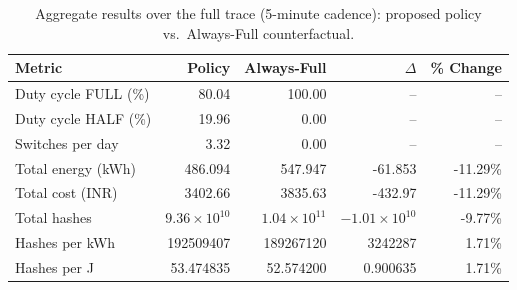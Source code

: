 \begin{table}[!t]
\centering
\caption{Aggregate results over the full trace (5-minute cadence): proposed policy vs.\ Always-Full counterfactual.}
\label{tab:main_results}
\begin{tabular}{@{}lrrrr@{}}
\toprule
Metric & Policy & Always-Full & $\Delta$ & \% Change \\
\midrule
Duty cycle FULL (\%) & 80.04 & 100.00 & -- & -- \\
Duty cycle HALF (\%) & 19.96 & 0.00 & -- & -- \\
Switches per day & 3.32 & 0.00 & -- & -- \\
\midrule
Total energy (kWh) & 486.094 & 547.947 & -61.853 & -11.29\% \\
Total cost (INR) & 3402.66 & 3835.63 & -432.97 & -11.29\% \\
Total hashes & $9.36\times 10^{10}$ & $1.04\times 10^{11}$ & $-1.01\times 10^{10}$ & -9.77\% \\
\midrule
Hashes per kWh & 192509407 & 189267120 & 3242287 & 1.71\% \\
Hashes per J & 53.474835 & 52.574200 & 0.900635 & 1.71\% \\
\bottomrule
\end{tabular}
\end{table}
